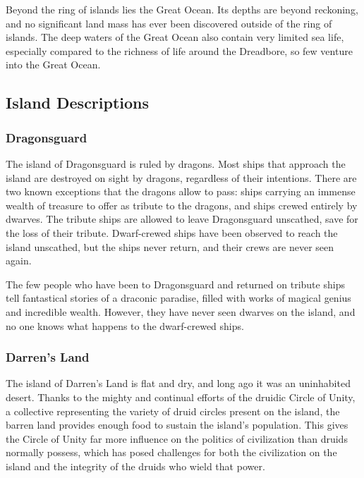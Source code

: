         Beyond the ring of islands lies the Great Ocean.
        Its depths are beyond reckoning, and no significant land mass has ever been discovered outside of the ring of islands.
        The deep waters of the Great Ocean also contain very limited sea life, especially compared to the richness of life around the Dreadbore, so few venture into the Great Ocean.

    \subsection{Island Descriptions}

        \subsubsection{Dragonsguard}
            The island of Dragonsguard is ruled by dragons.
            Most ships that approach the island are destroyed on sight by dragons, regardless of their intentions.
            There are two known exceptions that the dragons allow to pass: ships carrying an immense wealth of treasure to offer as tribute to the dragons, and ships crewed entirely by dwarves.
            The tribute ships are allowed to leave Dragonsguard unscathed, save for the loss of their tribute.
            Dwarf-crewed ships have been observed to reach the island unscathed, but the ships never return, and their crews are never seen again.

            The few people who have been to Dragonsguard and returned on tribute ships tell fantastical stories of a draconic paradise, filled with works of magical genius and incredible wealth.
            However, they have never seen dwarves on the island, and no one knows what happens to the dwarf-crewed ships.

        \subsubsection{Darren's Land}
            The island of Darren's Land is flat and dry, and long ago it was an uninhabited desert.
            Thanks to the mighty and continual efforts of the druidic Circle of Unity, a collective representing the variety of druid circles present on the island, the barren land provides enough food to sustain the island's population.
            This gives the Circle of Unity far more influence on the politics of civilization than druids normally possess, which has posed challenges for both the civilization on the island and the integrity of the druids who wield that power.


